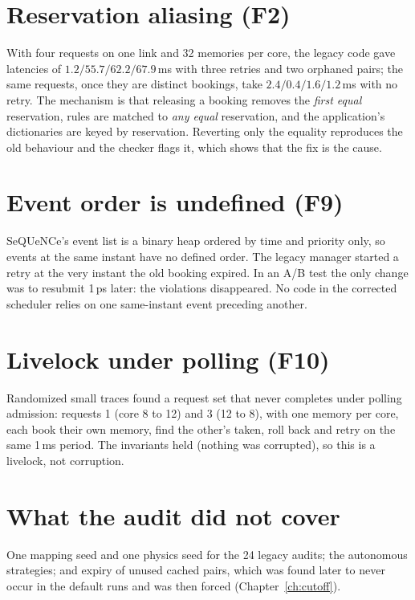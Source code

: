 \section{Reservation aliasing (F2)}
With four requests on one link and 32 memories per core, the legacy code gave latencies of $1.2/55.7/62.2/67.9$\,ms with three
retries and two orphaned pairs; the same requests, once they are distinct bookings, take $2.4/0.4/1.6/1.2$\,ms with no retry. The
mechanism is that releasing a booking removes the \emph{first equal} reservation, rules are matched to \emph{any equal}
reservation, and the application's dictionaries are keyed by reservation. Reverting only the equality reproduces the old
behaviour and the checker flags it, which shows that the fix is the cause.

\section{Event order is undefined (F9)}
SeQUeNCe's event list is a binary heap ordered by time and priority only, so events at the same instant have no defined order. The
legacy manager started a retry at the very instant the old booking expired. In an A/B test the only change was to resubmit 1\,ps later:
the violations disappeared. No code in the corrected scheduler relies on one same-instant event preceding another.

\section{Livelock under polling (F10)}
Randomized small traces found a request set that never completes under polling admission: requests 1 (core 8 to 12) and 3 (12 to 8),
with one memory per core, each book their own memory, find the other's taken, roll back and retry on the same 1\,ms period. The
invariants held (nothing was corrupted), so this is a livelock, not corruption.

\section{What the audit did not cover}
One mapping seed and one physics seed for the 24 legacy audits; the autonomous strategies; and expiry of unused cached pairs, which
was found later to never occur in the default runs and was then forced (Chapter~\ref{ch:cutoff}).

